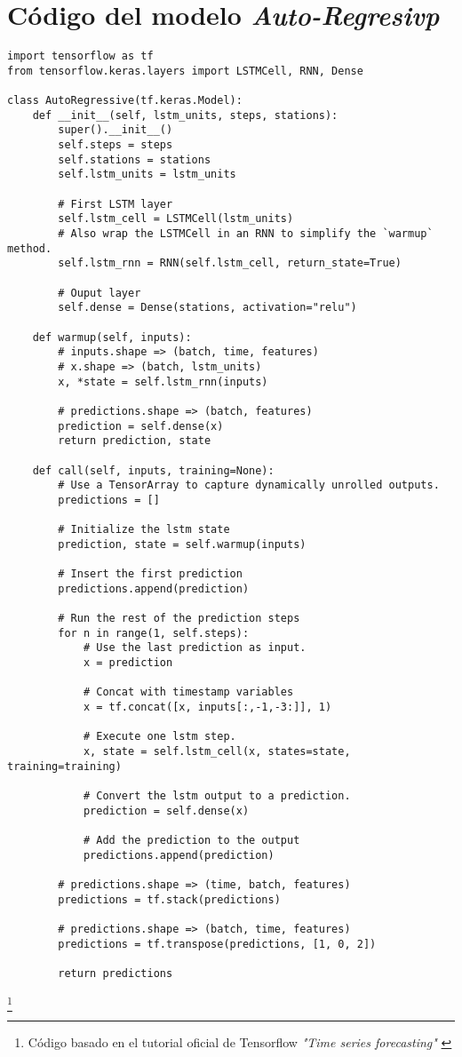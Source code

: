 \section{Código del modelo \textit{Auto-Regresivp}}\label{app:ar}

\begin{verbatim}
import tensorflow as tf
from tensorflow.keras.layers import LSTMCell, RNN, Dense

class AutoRegressive(tf.keras.Model):
    def __init__(self, lstm_units, steps, stations):
        super().__init__()
        self.steps = steps
        self.stations = stations
        self.lstm_units = lstm_units
        
        # First LSTM layer
        self.lstm_cell = LSTMCell(lstm_units)
        # Also wrap the LSTMCell in an RNN to simplify the `warmup` method.
        self.lstm_rnn = RNN(self.lstm_cell, return_state=True)
        
        # Ouput layer
        self.dense = Dense(stations, activation="relu")

    def warmup(self, inputs):
        # inputs.shape => (batch, time, features)
        # x.shape => (batch, lstm_units)
        x, *state = self.lstm_rnn(inputs)

        # predictions.shape => (batch, features)
        prediction = self.dense(x)
        return prediction, state

    def call(self, inputs, training=None):
        # Use a TensorArray to capture dynamically unrolled outputs.
        predictions = []

        # Initialize the lstm state
        prediction, state = self.warmup(inputs)

        # Insert the first prediction
        predictions.append(prediction)

        # Run the rest of the prediction steps
        for n in range(1, self.steps):
            # Use the last prediction as input.
            x = prediction
            
            # Concat with timestamp variables
            x = tf.concat([x, inputs[:,-1,-3:]], 1)
            
            # Execute one lstm step.
            x, state = self.lstm_cell(x, states=state, training=training)
                                      
            # Convert the lstm output to a prediction.
            prediction = self.dense(x)
            
            # Add the prediction to the output
            predictions.append(prediction)

        # predictions.shape => (time, batch, features)
        predictions = tf.stack(predictions)
        
        # predictions.shape => (batch, time, features)
        predictions = tf.transpose(predictions, [1, 0, 2])
        
        return predictions
\end{verbatim}

\footnote{Código basado en el tutorial oficial de Tensorflow \textit{"Time series forecasting"} \cite{tensorflow2015-whitepaper}}